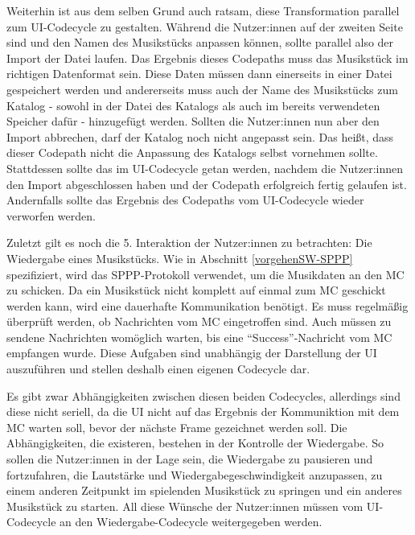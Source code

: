 Weiterhin ist aus dem selben Grund auch ratsam, diese Transformation parallel zum UI-Codecycle zu gestalten.
Während die Nutzer:innen auf der zweiten Seite sind und den Namen des Musikstücks anpassen können, sollte parallel also der Import der Datei laufen. \newline
Das Ergebnis dieses Codepaths muss das Musikstück im richtigen Datenformat sein.
Diese Daten müssen dann einerseits in einer Datei gespeichert werden und andererseits muss auch der Name des Musikstücks zum Katalog - sowohl in der Datei des Katalogs als auch im bereits verwendeten Speicher dafür - hinzugefügt werden.
Sollten die Nutzer:innen nun aber den Import abbrechen, darf der Katalog noch nicht angepasst sein.
Das heißt, dass dieser Codepath nicht die Anpassung des Katalogs selbst vornehmen sollte.
Stattdessen sollte das im UI-Codecycle getan werden, nachdem die Nutzer:innen den Import abgeschlossen haben und der Codepath erfolgreich fertig gelaufen ist.
Andernfalls sollte das Ergebnis des Codepaths vom UI-Codecycle wieder verworfen werden.

Zuletzt gilt es noch die 5. Interaktion der Nutzer:innen zu betrachten: Die Wiedergabe eines Musikstücks. \newline
Wie in Abschnitt \ref{vorgehenSW-SPPP} spezifiziert, wird das \ac{SPPP}-Protokoll verwendet, um die Musikdaten an den \ac{MC} zu schicken.
Da ein Musikstück nicht komplett auf einmal zum \ac{MC} geschickt werden kann, wird eine dauerhafte Kommunikation benötigt.
Es muss regelmäßig überprüft werden, ob Nachrichten vom \ac{MC} eingetroffen sind.
Auch müssen zu sendene Nachrichten womöglich warten, bis eine \enquote{Success}-Nachricht vom \ac{MC} empfangen wurde.
Diese Aufgaben sind unabhängig der Darstellung der \ac{UI} auszuführen und stellen deshalb einen eigenen Codecycle dar.

Es gibt zwar Abhängigkeiten zwischen diesen beiden Codecycles, allerdings sind diese nicht seriell, da die \ac{UI} nicht auf das Ergebnis der Kommuniktion mit dem \ac{MC} warten soll, bevor der nächste Frame gezeichnet werden soll. \newline
Die Abhängigkeiten, die existeren, bestehen in der Kontrolle der Wiedergabe.
So sollen die Nutzer:innen in der Lage sein, die Wiedergabe zu pausieren und fortzufahren, die Lautstärke und Wiedergabegeschwindigkeit anzupassen, zu einem anderen Zeitpunkt im spielenden Musikstück zu springen und ein anderes Musikstück zu starten. \newline
All diese Wünsche der Nutzer:innen müssen vom UI-Codecycle an den Wiedergabe-Codecycle weitergegeben werden.

